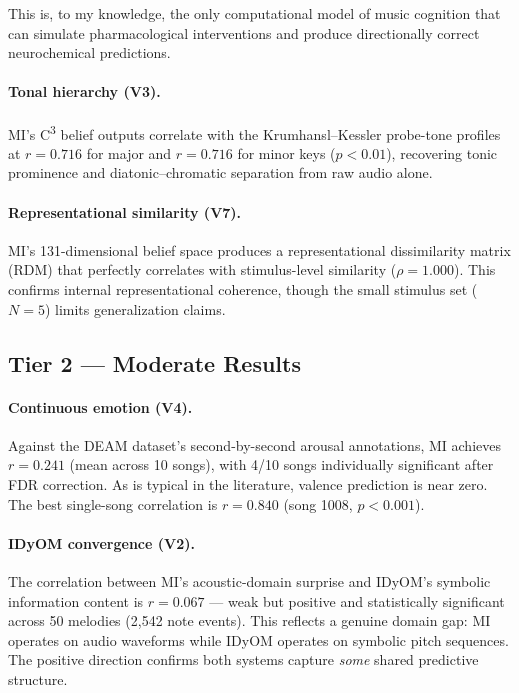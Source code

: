\documentclass[11pt]{article}
\newcommand{\cthree}{C\textsuperscript{3}}
\begin{document}
\noindent This is, to my knowledge, the only computational model of music cognition that can simulate pharmacological interventions and produce directionally correct neurochemical predictions.

\paragraph{Tonal hierarchy (V3).}
MI's \cthree{} belief outputs correlate with the Krumhansl--Kessler probe-tone profiles at $r = 0.716$ for major and $r = 0.716$ for minor keys ($p < 0.01$), recovering tonic prominence and diatonic--chromatic separation from raw audio alone.

\paragraph{Representational similarity (V7).}
MI's 131-dimensional belief space produces a representational dissimilarity matrix (RDM) that perfectly correlates with stimulus-level similarity ($\rho = 1.000$). This confirms internal representational coherence, though the small stimulus set ($N\!=\!5$) limits generalization claims.

\subsection{Tier 2 — Moderate Results}

\paragraph{Continuous emotion (V4).}
Against the DEAM dataset's second-by-second arousal annotations, MI achieves $r = 0.241$ (mean across 10 songs), with 4/10 songs individually significant after FDR correction. As is typical in the literature, valence prediction is near zero. The best single-song correlation is $r = 0.840$ (song 1008, $p < 0.001$).

\paragraph{IDyOM convergence (V2).}
The correlation between MI's acoustic-domain surprise and IDyOM's symbolic information content is $r = 0.067$ --- weak but positive and statistically significant across 50 melodies (2,542 note events). This reflects a genuine domain gap: MI operates on audio waveforms while IDyOM operates on symbolic pitch sequences. The positive direction confirms both systems capture \emph{some} shared predictive structure.
\end{document}
